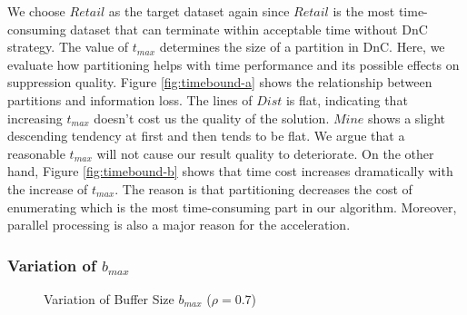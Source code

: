 We choose $Retail$ as the target dataset again since $Retail$
is the most time-consuming dataset that can terminate within
acceptable time without DnC strategy.
The value of $t_{max}$ determines the size of a partition in DnC. 
Here, we evaluate how partitioning helps with time performance and
its possible effects on suppression quality.
Figure \ref{fig:timebound-a} shows the relationship between partitions
and information loss. The lines of  $Dist$ is flat, indicating that
increasing $t_{max}$ doesn't cost us the quality of the solution. $Mine$
shows a slight descending tendency at first and then tends to be flat.
We argue that a reasonable $t_{max}$ will not cause our result quality to
deteriorate.
On the other hand, Figure \ref{fig:timebound-b} shows that
time cost increases dramatically  with the increase of  $t_{max}$.
The reason is that partitioning decreases the cost of enumerating \qids which
is the most time-consuming part in our algorithm. Moreover, parallel
processing is also a major reason for the acceleration.

\subsubsection{Variation of $b_{max}$}

\begin{figure}[tb]
\centering
{}
\caption{Variation of Buffer Size $b_{max}$ ($\rho=0.7$)}\label{fig:buffersize}
\end{figure}

